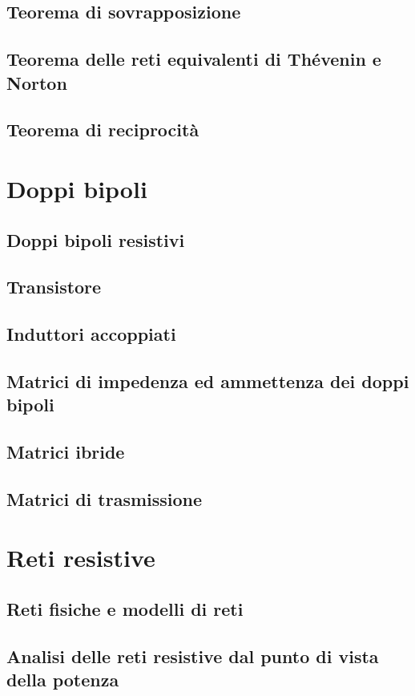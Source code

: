\documentclass[a4paper,12pt]{article}
\theoremstyle{mystyle}
\begin{document}
\subsection{Teorema di sovrapposizione}
\subsection{Teorema delle reti equivalenti di Thévenin e Norton}
\subsection{Teorema di reciprocità}

\section{Doppi bipoli}
\subsection{Doppi bipoli resistivi}
\subsection{Transistore}
\subsection{Induttori accoppiati}
\subsection{Matrici di impedenza ed ammettenza dei doppi bipoli}
\subsection{Matrici ibride}
\subsection{Matrici di trasmissione}

\section{Reti resistive}
\subsection{Reti fisiche e modelli di reti}
\subsection{Analisi delle reti resistive dal punto di vista della potenza}
\end{document}
